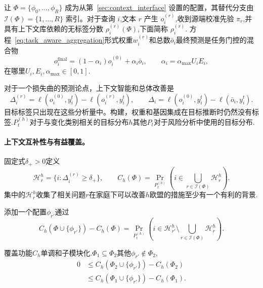 让 $\Phi=\{\phi_0,\ldots,\phi_R\}$ 成为从第~\ref{sec:context_interface} 设置的配置，其替代分支由 $\mathcal I(\Phi)=\{1,\ldots,R\}$ 索引。对于查询 $i$,文本 $r$ 产生 $o_i^{(r)}$,收到源端校准先验 $\pi_r$,并具有上下文库依赖的无标签分数 $\rho_i^{(r)}(\Phi)$,下面简称 $\rho_i^{(r)}$.
方程~\eqref{eq:task_aware_aggregation}形式权重$w_i^{(r)}$和总数$\bar o_i$最终预测是任务门控的混合物\[
o_i^{\mathrm{final}}=(1-\alpha_i)o_i^{(0)}+\alpha_i\bar o_i,
\qquad
\alpha_i=\alpha_{\max}U_iE_i,
\]在哪里$U_i,E_i,\alpha_{\max}\in[0,1]$.

对于一个损失曲的预测论点，上下文智能和总体改善是\[
\Delta_i^{(r)}
=\ell(o_i^{(0)},y_i^t)-\ell(o_i^{(r)},y_i^t),
\qquad
\Delta_i
=\ell(o_i^{(0)},y_i^t)-\ell(\bar o_i,y_i^t).
\]目标标签只出现在这些分析量中。构建，权重和基因集成在目标推断时仍然没有标签.$P_t^{(h)}$对于与变化类别相关的目标分布$h$其他$P_t$对于风险分析中使用的目标分布.

\paragraph{上下文互补性与有益覆盖。}
\label{app:repair-coverage}

固定式$\delta_+>0$定义
\begin{equation}
\mathcal H_r^h
=\{i:\Delta_i^{(r)}\geq\delta_+\},
\qquad
C_h(\Phi)
  =\Pr_{P_t^{(h)}}\!\left(i\in\bigcup_{r\in\mathcal I(\Phi)}\mathcal H_r^h\right).
\label{eq:potential_repair_coverage}
\end{equation}
集中的$\mathcal H_r^h$收集了相关问题$r$在家庭下可以改善$h$欧盟的措施至少有一个有利的背景.

添加一个配置$\phi_{r'}$通过
\begin{equation}
  C_h(\Phi\cup\{\phi_{r'}\})-C_h(\Phi)
  =\Pr_{P_t^{(h)}}\!\left(
    i\in\mathcal H_{r'}^h\setminus
    \bigcup_{r\in\mathcal I(\Phi)}\mathcal H_r^h
  \right).
  \label{eq:coverage_gain}
\end{equation}

\begin{lemma}[单调和子模块的环境覆盖]
\label{prop:coverage_submodular}覆盖功能$C_h$单调和子模块化.$\Phi_1\subseteq\Phi_2$其他$\phi_{r'}\notin\Phi_2$,
\begin{equation}
\begin{aligned}
0
&\leq C_h(\Phi_2\cup\{\phi_{r'}\})-C_h(\Phi_2)\\
&\leq C_h(\Phi_1\cup\{\phi_{r'}\})-C_h(\Phi_1).
\end{aligned}
\label{eq:coverage_diminishing_returns}
\end{equation}
\end{lemma}

